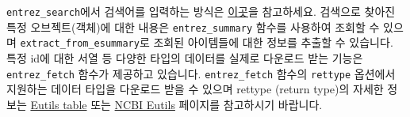 \documentclass[
]{book}
\newenvironment{Shaded}{\begin{snugshade}}{\end{snugshade}}
\newcommand{\AttributeTok}[1]{\textcolor[rgb]{0.77,0.63,0.00}{#1}}
\newcommand{\FunctionTok}[1]{\textcolor[rgb]{0.00,0.00,0.00}{#1}}
\newcommand{\NormalTok}[1]{#1}
\newcommand{\OtherTok}[1]{\textcolor[rgb]{0.56,0.35,0.01}{#1}}
\newcommand{\SpecialCharTok}[1]{\textcolor[rgb]{0.00,0.00,0.00}{#1}}
\newcommand{\StringTok}[1]{\textcolor[rgb]{0.31,0.60,0.02}{#1}}
\begin{document}
\begin{Shaded}
\end{Shaded}

\texttt{entrez\_search}에서 검색어를 입력하는 방식은 \href{https://cran.r-project.org/web/packages/rentrez/vignettes/rentrez_tutorial.html\#building-search-terms}{이곳}을 참고하세요. 검색으로 찾아진 특정 오브젝트(객체)에 대한 내용은 \texttt{entrez\_summary} 함수를 사용하여 조회할 수 있으며 \texttt{extract\_from\_esummary}로 조회된 아이템들에 대한 정보를 추출할 수 있습니다. 특정 id에 대한 서열 등 다양한 타입의 데이터를 실제로 다운로드 받는 기능은 \texttt{entrez\_fetch} 함수가 제공하고 있습니다. \texttt{entrez\_fetch} 함수의 \texttt{rettype} 옵션에서 지원하는 데이터 타입을 다운로드 받을 수 있으며 rettype (return type)의 자세한 정보는 \href{https://www.ncbi.nlm.nih.gov/books/NBK25499/table/chapter4.T._valid_values_of__retmode_and/}{Eutils table} 또는 \href{https://www.ncbi.nlm.nih.gov/books/NBK25499/}{NCBI Eutils} 페이지를 참고하시기 바랍니다.
\end{document}
